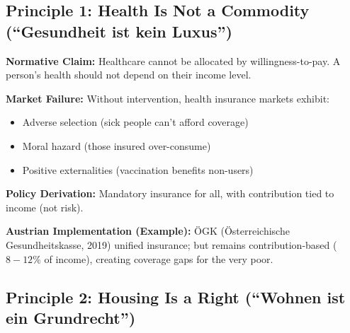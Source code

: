 
\subsection{Principle 1: Health Is Not a Commodity (``Gesundheit ist kein Luxus'')}

\begin{tcolorbox}[colback=gray!5!white, colframe=gray!75!black,
    title=Principle GEN-1: Health Universality]

\textbf{Normative Claim:} Healthcare cannot be allocated by willingness-to-pay. A person's health should not depend on their income level.

\textbf{Market Failure:} Without intervention, health insurance markets exhibit:
\begin{itemize}[nosep]
\item Adverse selection (sick people can't afford coverage)
\item Moral hazard (those insured over-consume)
\item Positive externalities (vaccination benefits non-users)
\end{itemize}

\textbf{Policy Derivation:} Mandatory insurance for all, with contribution tied to income (not risk).

\textbf{Austrian Implementation (Example):} ÖGK (Österreichische Gesundheitskasse, 2019) unified insurance; but remains contribution-based ($8-12\%$ of income), creating coverage gaps for the very poor.

\end{tcolorbox}


\subsection{Principle 2: Housing Is a Right (``Wohnen ist ein Grundrecht'')}

